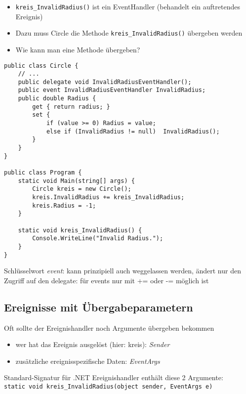 \begin{itemize}
\item \lstinline$kreis_InvalidRadius()$ ist ein EventHandler (behandelt ein auftretendes Ereignis)
\item Dazu muss Circle die Methode \lstinline$kreis_InvalidRadius()$ übergeben werden
\item Wie kann man eine Methode übergeben? 
\end{itemize}

\begin{lstlisting}[language={[Sharp]C}]
public class Circle {
	// ...
	public delegate void InvalidRadiusEventHandler();
	public event InvalidRadiusEventHandler InvalidRadius;
	public double Radius {
		get { return radius; }
		set {
			if (value >= 0) Radius = value;
			else if (InvalidRadius != null)  InvalidRadius();
		}
	}
}

public class Program {  
	static void Main(string[] args) {
		Circle kreis = new Circle();
		kreis.InvalidRadius += kreis_InvalidRadius;
		kreis.Radius = -1;
	}

	static void kreis_InvalidRadius() {
		Console.WriteLine("Invalid Radius.");  
	}
}
\end{lstlisting}

Schlüsselwort \emph{event}: kann prinzipiell auch weggelassen werden, ändert nur den Zugriff auf den delegate: für events nur mit += oder -=  möglich ist

\subsection{Ereignisse mit Übergabeparametern}

Oft sollte der Ereignishandler noch Argumente übergeben bekommen
\begin{itemize}
\item wer hat das Ereignis ausgelöst (hier: kreis): \emph{Sender}
\item zusätzliche ereignisspezifische Daten: \emph{EventArgs}
\end{itemize}
Standard-Signatur für .NET Ereignishandler enthält diese 2 Argumente:\\
\lstinline$static void kreis_InvalidRadius(object sender, EventArgs e)$

